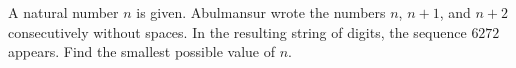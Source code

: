 A natural number $n$ is given. Abulmansur wrote the numbers $n$, $n+1$, and $n+2$ consecutively without spaces. In the resulting string of digits, the sequence $6272$ appears. Find the smallest possible value of $n$.
